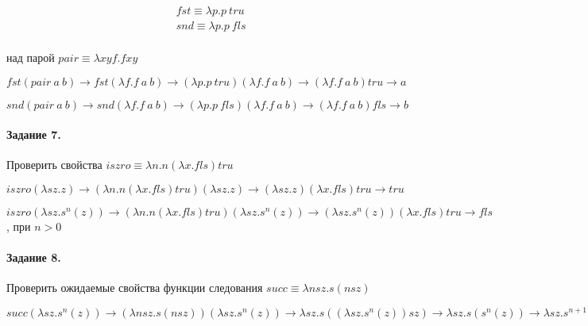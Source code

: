 \documentclass[a4paper,12pt]{article}
\begin{document}
\[
	\begin{split}
		&fst \equiv \lambda p . p ~tru\\
		&snd \equiv \lambda p . p ~fls\\
	\end{split}
\]

над парой $pair \equiv \lambda xyf . fxy$

\begin{Solution}

$fst\left(pair ~a ~b\right) \rightarrow fst\left(\lambda f . f ~a ~b\right) \rightarrow \left(\lambda p . p ~tru\right)\left(\lambda f . f ~a ~b\right) \rightarrow \left(\lambda f . f ~a ~b\right)tru \rightarrow a$

$snd\left(pair ~a ~b\right) \rightarrow snd\left(\lambda f . f ~a ~b\right) \rightarrow \left(\lambda p . p ~fls\right)\left(\lambda f . f ~a ~b\right) \rightarrow \left(\lambda f . f ~a ~b\right)fls \rightarrow b$

\end{Solution}

\paragraph{Задание 7.} Проверить свойства $iszro \equiv \lambda n . n\left(\lambda x . fls\right)tru$

\begin{Solution}

$iszro \left(\lambda sz . z\right) \rightarrow \left(\lambda n . n\left(\lambda x . fls\right)tru\right)\left(\lambda sz . z\right) \rightarrow \left(\lambda sz . z\right)\left(\lambda x . fls\right)tru \rightarrow tru$

$iszro \left(\lambda sz . s^n\left(z\right)\right) \rightarrow \left(\lambda n . n\left(\lambda x . fls\right)tru\right)\left(\lambda sz . s^n\left(z\right)\right) \rightarrow \left(\lambda sz . s^n\left(z\right)\right)\left(\lambda x . fls\right)tru \rightarrow fls$, при $n > 0$

\end{Solution}

\paragraph{Задание 8.} Проверить ожидаемые свойства функции следования $succ \equiv \lambda nsz . s \left(nsz\right)$

\begin{Solution}

$succ \left(\lambda sz . s^n\left(z\right)\right) \rightarrow \left(\lambda nsz . s \left(nsz\right)\right)\left(\lambda sz . s^n\left(z\right)\right) \rightarrow \lambda sz . s\left(\left(\lambda sz . s^n\left(z\right)\right)sz\right) \rightarrow \lambda sz . s\left(s^n\left(z\right)\right) \rightarrow \lambda sz . s^{n+1}\left(z\right)$

\end{Solution}
\end{document}
